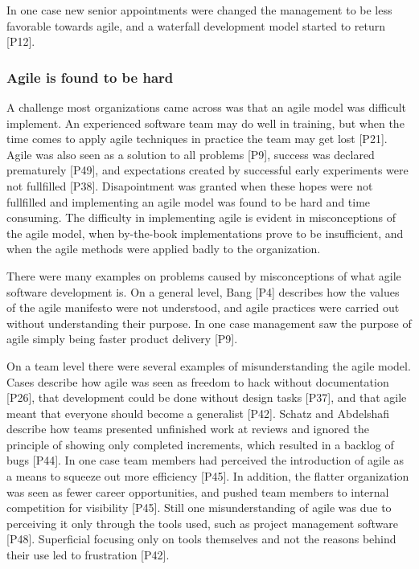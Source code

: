 \documentclass[preprint,authoryear,12pt]{elsarticle}
\begin{document}
In one case new senior appointments were changed the management to be less
favorable towards agile, and a waterfall development model started to return
[P12].



\subsubsection{Agile is found to be hard}

A challenge most organizations came across was that an agile model was difficult
implement. An experienced software team may do well in training, but when the
time comes to apply agile techniques in practice the team may get lost [P21].
Agile was also seen as a solution to all problems [P9], success was declared
prematurely [P49], and expectations created by successful early experiments were
not fullfilled [P38]. Disapointment was granted when these hopes were not
fullfilled and implementing an agile model was found to be hard and time
consuming. The difficulty in implementing agile is evident in misconceptions of
the agile model, when by-the-book implementations prove to be insufficient, and
when the agile methods were applied badly to the organization.


There were many examples on problems caused by misconceptions of what agile
software development is. On a general level, Bang [P4] describes how the values
of the agile manifesto were not understood, and agile practices were carried out
without understanding their purpose. In one case management saw the purpose of
agile simply being faster product delivery [P9].

On a team level there were several examples of misunderstanding the agile model.
Cases describe how agile was seen as freedom to hack without documentation
[P26], that development could be done without design tasks [P37], and that agile
meant that everyone should become a generalist [P42]. Schatz and Abdelshafi
describe how teams presented unfinished work at reviews and ignored the
principle of showing only completed increments, which resulted in a backlog of
bugs [P44]. In one case team members had perceived the introduction of agile as
a means to squeeze out more efficiency [P45]. In addition, the flatter
organization was seen as fewer career opportunities, and pushed team members to
internal competition for visibility [P45].
Still one misunderstanding of agile was due to perceiving it only through the
tools used, such as project management software [P48]. Superficial focusing only
on tools themselves and not the reasons behind their use led to frustration
[P42].
\end{document}
